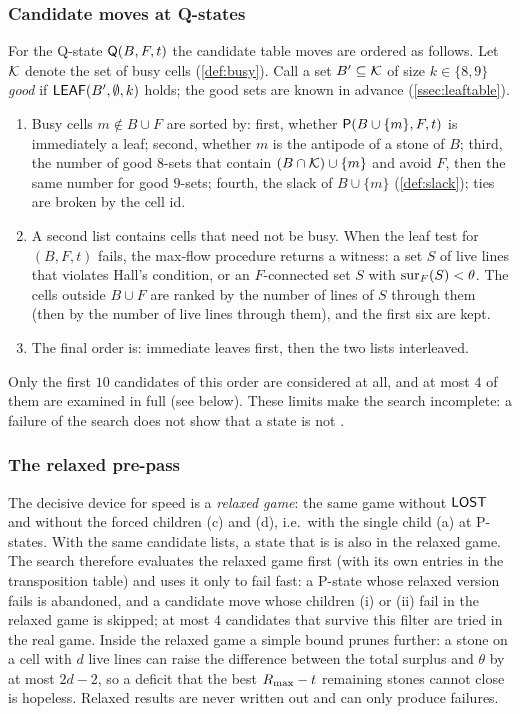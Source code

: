\subsubsection*{Candidate moves at Q-states}
For the Q-state $\mathsf{Q}(B,F,t)$ the candidate table moves are ordered as follows. Let
$\mathcal{K}$ denote the set of busy cells (\cref{def:busy}). Call a set $B'\subseteq\mathcal{K}$ of size $k\in\{8,9\}$
\emph{good} if $\mathsf{LEAF}(B',\emptyset,k)$ holds; the good sets are known in advance (\cref{ssec:leaftable}).
\begin{enumerate}[label=(\arabic*),leftmargin=2.2em]
\item Busy cells $m\notin B\cup F$ are sorted by: first, whether $\mathsf{P}(B\cup\{m\},F,t)$ is immediately a
  leaf; second, whether $m$ is the antipode of a stone of $B$; third, the number of good $8$-sets that
  contain $(B\cap\mathcal{K})\cup\{m\}$ and avoid $F$, then the same number for good $9$-sets; fourth, the slack
  of $B\cup\{m\}$ (\cref{def:slack}); ties are broken by the cell id.
\item A second list contains cells that need not be busy. When the leaf test for $(B,F,t)$ fails, the
  max-flow procedure returns a witness: a set $S$ of live lines that violates Hall's condition, or an
  $F$-connected set $S$ with $\operatorname{sur}_F(S)<\theta$. The cells outside $B\cup F$ are ranked by the number of
  lines of $S$ through them (then by the number of live lines through them), and the first six are kept.
\item The final order is: immediate leaves first, then the two lists interleaved.
\end{enumerate}
Only the first $10$ candidates of this order are considered at all, and at most $4$ of them are examined in
full (see below). These limits make the search incomplete: a failure of the search does not show that a
state is not \WON.

\subsubsection*{The relaxed pre-pass}
The decisive device for speed is a \emph{relaxed game}: the same game without $\mathsf{LOST}$ and without the
forced children (c) and (d), i.e.\ with the single child (a) at P-states. With the same candidate lists, a
state that is \WON{} is also \WON{} in the relaxed game. The search therefore evaluates the relaxed game
first (with its own entries in the transposition table) and uses it only to fail fast: a P-state whose
relaxed version fails is abandoned, and a candidate move whose children (i) or (ii) fail in the relaxed
game is skipped; at most $4$ candidates that survive this filter are tried in the real game. Inside the
relaxed game a simple bound prunes further: a stone on a cell with $d$ live lines can raise the difference
between the total surplus and $\theta$ by at most $2d-2$, so a deficit that the best $R_{\max}-t$ remaining
stones cannot close is hopeless. Relaxed results are never written out and can only produce failures.

